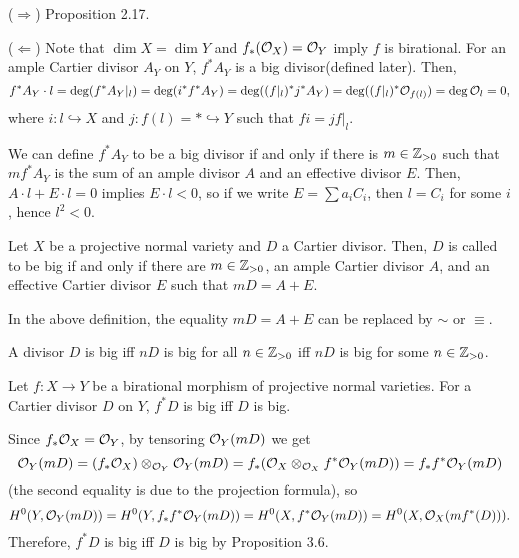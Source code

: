 \documentclass{../../small}
\begin{document}
\begin{pf}
($\Rightarrow$) Proposition 2.17.

($\Leftarrow$)
Note that $\dim X=\dim Y$ and $f_*(\mathcal{O}_X)=\mathcal{O}_Y$ imply $f$ is birational.
For an ample Cartier divisor $A_Y$ on $Y$, $f^*A_Y$ is a big divisor(defined later).
Then,
\[f^*A_Y\cdot l=\deg(f^*A_Y|_l)=\deg(i^*f^*A_Y)=\deg((f|_l)^*j^*A_Y)=\deg((f|_l)^*\mathcal{O}_{f(l)})=\deg\mathcal{O}_l=0,\]
where $i:l\hookrightarrow X$ and $j:f(l)=*\hookrightarrow Y$ such that $fi=jf|_l$.

We can define $f^*A_Y$ to be a big divisor if and only if there is $m\in\mathbb{Z}_{>0}$ such that $mf^*A_Y$ is the sum of an ample divisor $A$ and an effective divisor $E$.
Then, $A\cdot l+E\cdot l=0$ implies $E\cdot l<0$, so if we write $E=\sum a_iC_i$, then $l=C_i$ for some $i$, hence $l^2<0$.
\end{pf}

\begin{defn}
Let $X$ be a projective normal variety and $D$ a Cartier divisor.
Then, $D$ is called to be big if and only if there are $m\in\mathbb{Z}_{>0}$, an ample Cartier divisor $A$, and an effective Cartier divisor $E$ such that $mD=A+E$.
\end{defn}

\begin{rmk}
In the above definition, the equality $mD=A+E$ can be replaced by $\sim$ or $\equiv$.
\end{rmk}

\begin{rmk}
A divisor $D$ is big iff $nD$ is big for all $n\in\mathbb{Z}_{>0}$ iff $nD$ is big for some $n\in\mathbb{Z}_{>0}$.
\end{rmk}

\begin{prop}
Let $f:X\to Y$ be a birational morphism of projective normal varieties.
For a Cartier divisor $D$ on $Y$, $f^*D$ is big iff $D$ is big.
\end{prop}
\begin{pf}
Since $f_*\mathcal{O}_X=\mathcal{O}_Y$, by tensoring $\mathcal{O}_Y(mD)$ we get
\[\mathcal{O}_Y(mD)=(f_*\mathcal{O}_X)\otimes_{\mathcal{O}_Y}\mathcal{O}_Y(mD)=f_*(\mathcal{O}_X\otimes_{\mathcal{O}_X}f^*\mathcal{O}_Y(mD))=f_*f^*\mathcal{O}_Y(mD)\]
(the second equality is due to the projection formula),
so
\[H^0(Y,\mathcal{O}_Y(mD))=H^0(Y,f_*f^*\mathcal{O}_Y(mD))=H^0(X,f^*\mathcal{O}_Y(mD))=H^0(X,\mathcal{O}_X(mf^*(D))).\]
Therefore, $f^*D$ is big iff $D$ is big by Proposition 3.6.
\end{pf}
\end{document}
